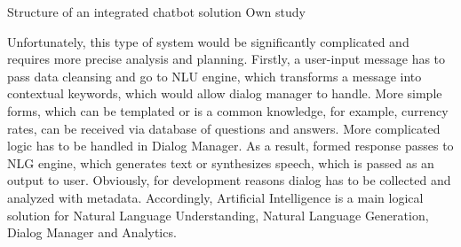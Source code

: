 \mttable
{Structure of an integrated chatbot solution}
{Own study}
{
}

Unfortunately, this type of system would be significantly complicated and requires more precise analysis and planning.
Firstly, a user-input message has to pass data cleansing and go to NLU engine, which transforms a message into contextual keywords, which would allow dialog manager to handle.
More simple forms, which can be templated or is a common knowledge, for example, currency rates, can be received via database of questions and answers.
More complicated logic has to be handled in Dialog Manager.
As a result, formed response passes to NLG engine, which generates text or synthesizes speech, which is passed as an output to user.
Obviously, for development reasons dialog has to be collected and analyzed with metadata. 
Accordingly, Artificial Intelligence is a main logical solution for Natural Language Understanding, Natural Language Generation, Dialog Manager and Analytics.

